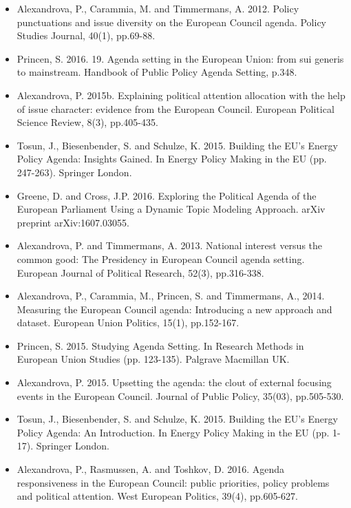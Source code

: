 \begin{itemize}
	\item Alexandrova, P., Carammia, M. and Timmermans, A. 2012. Policy punctuations and issue diversity on the European Council agenda. Policy Studies Journal, 40(1), pp.69-88.
	\item Princen, S. 2016. 19. Agenda setting in the European Union: from sui generis to mainstream. Handbook of Public Policy Agenda Setting, p.348.
	\item Alexandrova, P. 2015b. Explaining political attention allocation with the help of issue character: evidence from the European Council. European Political Science Review, 8(3), pp.405-435.
	\item Tosun, J., Biesenbender, S. and Schulze, K. 2015. Building the EU’s Energy Policy Agenda: Insights Gained. In Energy Policy Making in the EU (pp. 247-263). Springer London.
	\item Greene, D. and Cross, J.P. 2016. Exploring the Political Agenda of the European Parliament Using a Dynamic Topic Modeling Approach. arXiv preprint arXiv:1607.03055.
	\item Alexandrova, P. and Timmermans, A. 2013. National interest versus the common good: The Presidency in European Council agenda setting. European Journal of Political Research, 52(3), pp.316-338.
	\item Alexandrova, P., Carammia, M., Princen, S. and Timmermans, A., 2014. Measuring the European Council agenda: Introducing a new approach and dataset. European Union Politics, 15(1), pp.152-167.
	\item Princen, S. 2015. Studying Agenda Setting. In Research Methods in European Union Studies (pp. 123-135). Palgrave Macmillan UK.
	\item Alexandrova, P. 2015. Upsetting the agenda: the clout of external focusing events in the European Council. Journal of Public Policy, 35(03), pp.505-530.
	\item Tosun, J., Biesenbender, S. and Schulze, K. 2015. Building the EU’s Energy Policy Agenda: An Introduction. In Energy Policy Making in the EU (pp. 1-17). Springer London.
	\item Alexandrova, P., Rasmussen, A. and Toshkov, D. 2016. Agenda responsiveness in the European Council: public priorities, policy problems and political attention. West European Politics, 39(4), pp.605-627.
	
\end{itemize}
